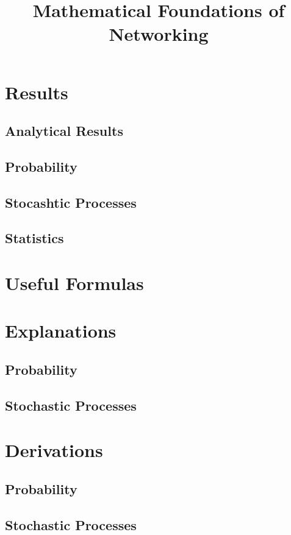 \documentclass[letterpaper,12pt]{article}
\title{Mathematical Foundations of Networking}
\begin{document}
\raggedright

\setlength{\columnseprule}{0.5pt}
\setcounter{tocdepth}{4}
\setcounter{secnumdepth}{6}
\tableofcontents


\newpage
\newlength{\tmpparskip}
\setlength{\tmpparskip}{\parskip}
\setlength{\parskip}{-3mm}
\section{Results}
\subsection{Analytical Results}

\subsection{Probability}

\subsection{Stocashtic Processes}

\subsection{Statistics}


\newpage
\section{Useful Formulas}


\newpage
\setlength{\parskip}{\tmpparskip}
\section{Explanations}
\subsection{Probability}


\newpage
\subsection{Stochastic Processes}


\newpage
\section{Derivations}
\subsection{Probability}

\subsection{Stochastic Processes}

\end{document}
